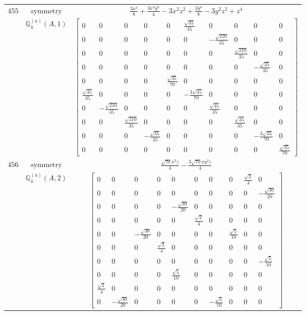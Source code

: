 \documentclass[fleqn,8pt,landscape]{jsarticle}
\begin{document}
\begin{longtable}{ccc}
$ 455 $ & $ \text{symmetry} $ & $ \frac{3 x^{4}}{8} + \frac{3 x^{2} y^{2}}{4} - 3 x^{2} z^{2} + \frac{3 y^{4}}{8} - 3 y^{2} z^{2} + z^{4} $ \\
$  $ & $ \mathbb{Q}_{4}^{(a)}(A,1) $ & $ \begin{bmatrix} 0 & 0 & 0 & 0 & 0 & \frac{\sqrt{35}}{35} & 0 & 0 & 0 & 0 \\ 0 & 0 & 0 & 0 & 0 & 0 & - \frac{\sqrt{210}}{35} & 0 & 0 & 0 \\ 0 & 0 & 0 & 0 & 0 & 0 & 0 & \frac{\sqrt{210}}{35} & 0 & 0 \\ 0 & 0 & 0 & 0 & 0 & 0 & 0 & 0 & - \frac{\sqrt{35}}{35} & 0 \\ 0 & 0 & 0 & 0 & \frac{\sqrt{35}}{70} & 0 & 0 & 0 & 0 & 0 \\ \frac{\sqrt{35}}{35} & 0 & 0 & 0 & 0 & - \frac{3 \sqrt{35}}{70} & 0 & 0 & 0 & 0 \\ 0 & - \frac{\sqrt{210}}{35} & 0 & 0 & 0 & 0 & \frac{\sqrt{35}}{35} & 0 & 0 & 0 \\ 0 & 0 & \frac{\sqrt{210}}{35} & 0 & 0 & 0 & 0 & \frac{\sqrt{35}}{35} & 0 & 0 \\ 0 & 0 & 0 & - \frac{\sqrt{35}}{35} & 0 & 0 & 0 & 0 & - \frac{3 \sqrt{35}}{70} & 0 \\ 0 & 0 & 0 & 0 & 0 & 0 & 0 & 0 & 0 & \frac{\sqrt{35}}{70} \end{bmatrix} $ \\ \hline
$ 456 $ & $ \text{symmetry} $ & $ \frac{\sqrt{70} x^{3} z}{4} - \frac{3 \sqrt{70} x y^{2} z}{4} $ \\
$  $ & $ \mathbb{Q}_{4}^{(a)}(A,2) $ & $ \begin{bmatrix} 0 & 0 & 0 & 0 & 0 & 0 & 0 & 0 & \frac{\sqrt{2}}{4} & 0 \\ 0 & 0 & 0 & 0 & 0 & 0 & 0 & 0 & 0 & - \frac{\sqrt{30}}{20} \\ 0 & 0 & 0 & 0 & - \frac{\sqrt{30}}{20} & 0 & 0 & 0 & 0 & 0 \\ 0 & 0 & 0 & 0 & 0 & \frac{\sqrt{2}}{4} & 0 & 0 & 0 & 0 \\ 0 & 0 & - \frac{\sqrt{30}}{20} & 0 & 0 & 0 & 0 & \frac{\sqrt{5}}{10} & 0 & 0 \\ 0 & 0 & 0 & \frac{\sqrt{2}}{4} & 0 & 0 & 0 & 0 & 0 & 0 \\ 0 & 0 & 0 & 0 & 0 & 0 & 0 & 0 & 0 & - \frac{\sqrt{5}}{10} \\ 0 & 0 & 0 & 0 & \frac{\sqrt{5}}{10} & 0 & 0 & 0 & 0 & 0 \\ \frac{\sqrt{2}}{4} & 0 & 0 & 0 & 0 & 0 & 0 & 0 & 0 & 0 \\ 0 & - \frac{\sqrt{30}}{20} & 0 & 0 & 0 & 0 & - \frac{\sqrt{5}}{10} & 0 & 0 & 0 \end{bmatrix} $ \\ \hline

\end{longtable}
\end{document}
